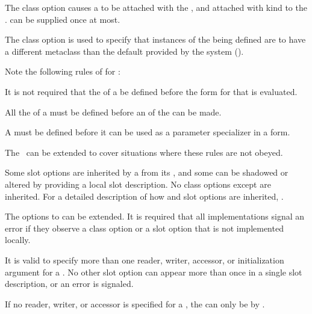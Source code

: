  
\itemitem{\bull} 
The  class option causes a  
to be attached with the  ,
and attached with kind  to the .
 can be supplied once at most.
 
\itemitem{\bull}
The  class option is used to specify that
instances of the  being defined are to have a different metaclass
than the default provided by the system ().
 
\endlist
                             
Note the following rules of  for :
 
\beginlist
 
\itemitem{\bull}
It is not required that the  of a  be defined before
the  form for that  is evaluated.
 
\itemitem{\bull}
All the  of a  must be defined before 
an  of the  can be made.
 
\itemitem{\bull}
A  must be defined before it can be used as a parameter
specializer in a  form.
 
\endlist
 
The \OS\ can be extended to cover situations where these rules are not
obeyed.
 
Some slot options are inherited by a  from its 
, and
some can be shadowed or altered by providing a local slot description.
No class options except  are inherited.  For a
detailed description of how  and slot options are inherited, 
\seesection\SlotInheritance.
 
The options to  can be extended.  It is required that
all implementations signal an error if they observe a class option or
a slot option that is not implemented locally.
 
It is valid to specify more than one reader, writer, accessor, or
initialization argument for a .  No other slot option can
appear
more than once in a single slot description, or an error is
signaled.
 
If no reader, writer, or accessor is specified for a , 
the  can only be  by .
 
